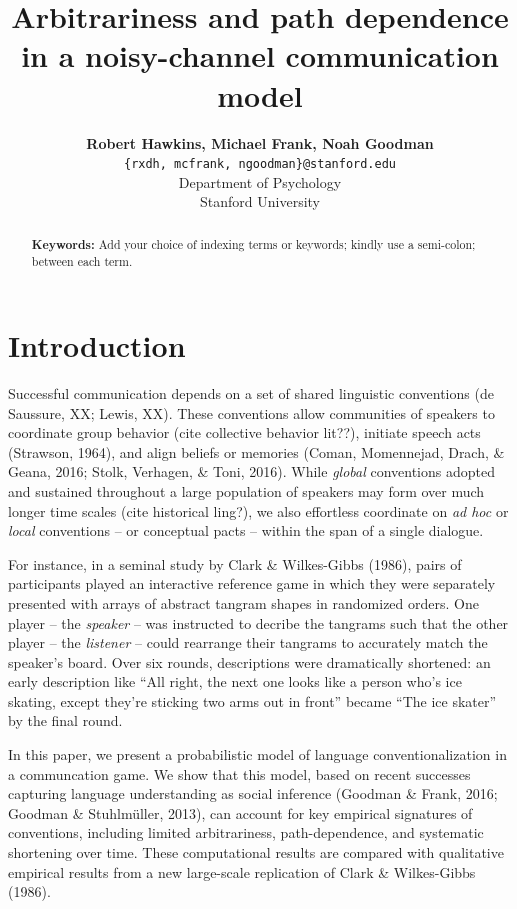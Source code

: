 \documentclass[10pt, letterpaper]{article}
\title{Arbitrariness and path dependence in a noisy-channel communication model}
\author{{\large \bf Robert Hawkins, Michael Frank, Noah Goodman} \\ \texttt{\{rxdh, mcfrank, ngoodman\}@stanford.edu} \\ Department of Psychology \\ Stanford University}
\begin{document}
\maketitle

\begin{abstract}


\textbf{Keywords:}
Add your choice of indexing terms or keywords; kindly use a semi-colon;
between each term.
\end{abstract}

\section{Introduction}\label{introduction}

Successful communication depends on a set of shared linguistic
conventions (de Saussure, XX; Lewis, XX). These conventions allow
communities of speakers to coordinate group behavior (cite collective
behavior lit??), initiate speech acts (Strawson, 1964), and align
beliefs or memories (Coman, Momennejad, Drach, \& Geana, 2016; Stolk,
Verhagen, \& Toni, 2016). While \emph{global} conventions adopted and
sustained throughout a large population of speakers may form over much
longer time scales (cite historical ling?), we also effortless
coordinate on \emph{ad hoc} or \emph{local} conventions -- or conceptual
pacts -- within the span of a single dialogue.

For instance, in a seminal study by Clark \& Wilkes-Gibbs (1986), pairs
of participants played an interactive reference game in which they were
separately presented with arrays of abstract tangram shapes in
randomized orders. One player -- the \emph{speaker} -- was instructed to
decribe the tangrams such that the other player -- the \emph{listener}
-- could rearrange their tangrams to accurately match the speaker's
board. Over six rounds, descriptions were dramatically shortened: an
early description like ``All right, the next one looks like a person
who's ice skating, except they're sticking two arms out in front''
became ``The ice skater'' by the final round.

In this paper, we present a probabilistic model of language
conventionalization in a communcation game. We show that this model,
based on recent successes capturing language understanding as social
inference (Goodman \& Frank, 2016; Goodman \& Stuhlmüller, 2013), can
account for key empirical signatures of conventions, including limited
arbitrariness, path-dependence, and systematic shortening over time.
These computational results are compared with qualitative empirical
results from a new large-scale replication of Clark \& Wilkes-Gibbs
(1986).
\end{document}
